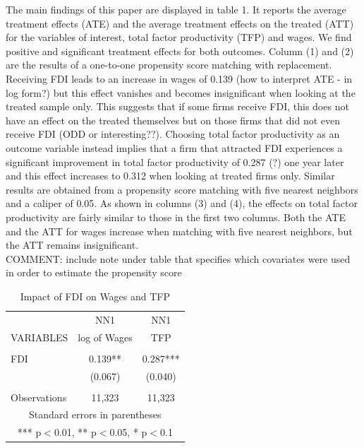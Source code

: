 \documentclass[a4paper,12pt]{scrartcl}
\begin{document}
The main findings of this paper are displayed in table 1. It reports the average treatment effects (ATE) and the average treatment effects on the treated (ATT) for the variables of interest, total factor productivity (TFP) and wages. We find positive and significant treatment effects for both outcomes. Column (1) and (2) are the results of a one-to-one propensity score matching with replacement. Receiving FDI leads to an increase in wages of 0.139 (how to interpret ATE - in log form?) but this effect vanishes and becomes insignificant when looking at the treated sample only. This suggests that if some firms receive FDI, this does not have an effect on the treated themselves but on those firms that did not even receive FDI (ODD or interesting??).  Choosing total factor productivity as an outcome variable instead implies that a firm that attracted FDI experiences a significant improvement in total factor productivity of 0.287 (?) one year later and this effect increases to 0.312 when looking at treated firms only. Similar results are obtained from a propensity score matching with five nearest neighbors and a caliper of 0.05. As shown in columns (3) and (4), the effects on total factor productivity are fairly similar to those in the first two columns. Both the ATE and the ATT for wages increase when matching with five nearest neighbors, but the ATT remains insignificant. \\

COMMENT: include note under table that specifies which covariates were used in order to estimate the propensity score

\begin{table}[htbp]\centering
\caption{Impact of FDI on Wages and TFP}
\begin{tabular}{lcc} \hline
 &NN1 & NN1\\
VARIABLES & log of Wages & TFP \\ \hline
 &  &  \\
FDI  & 0.139** & 0.287*** \\
 & (0.067) & (0.040) \\
 &  &  \\
 Observations & 11,323 & 11,323 \\ \hline
\multicolumn{3}{c}{ Standard errors in parentheses} \\
\multicolumn{3}{c}{ *** p$<$0.01, ** p$<$0.05, * p$<$0.1} \\
\end{tabular}
\end{table}
\end{document}
